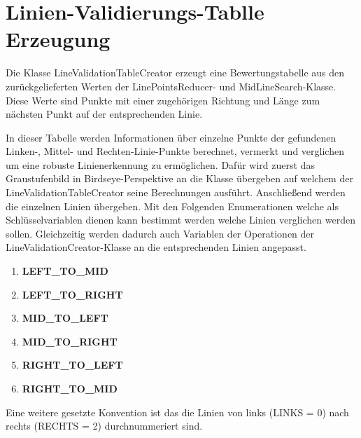 %

\chapter{Linien-Validierungs-Tablle Erzeugung}
\label{cha:Linien-Validierungs-Tablle Erzeugung} 
%
%
Die Klasse LineValidationTableCreator erzeugt eine Bewertungstabelle aus den zur{\"u}ckgelieferten Werten der LinePointsReducer- und MidLineSearch-Klasse. Diese Werte sind Punkte mit einer zugeh{\"o}rigen Richtung und L{\"a}nge zum n{\"a}chsten Punkt auf der entsprechenden Linie. 

In dieser Tabelle werden Informationen {\"u}ber einzelne Punkte der gefundenen Linken-, Mittel- und Rechten-Linie-Punkte berechnet, vermerkt und verglichen um eine robuste Linienerkennung zu erm{\"o}glichen. Daf{\"u}r wird zuerst das Graustufenbild in Birdseye-Perspektive an die Klasse {\"u}bergeben auf welchem der LineValidationTableCreator seine Berechnungen ausf{\"u}hrt. Anschlie{\ss}end werden die einzelnen Linien {\"u}bergeben. Mit den Folgenden Enumerationen welche als Schl{\"u}sselvariablen dienen kann bestimmt werden welche Linien verglichen werden sollen. Gleichzeitig werden dadurch auch Variablen der Operationen der LineValidationCreator-Klasse an die entsprechenden Linien angepasst.


\begin{enumerate}

\item[] \textbf{LEFT\_TO\_MID} \hfill \\
\item[] \textbf{LEFT\_TO\_RIGHT} \hfill \\

\item[] \textbf{MID\_TO\_LEFT} \hfill \\
\item[] \textbf{MID\_TO\_RIGHT} \hfill \\

\item[] \textbf{RIGHT\_TO\_LEFT} \hfill \\
\item[] \textbf{RIGHT\_TO\_MID} \hfill \\
\end{enumerate}


Eine weitere gesetzte Konvention ist das die Linien von links (LINKS = 0) nach rechts (RECHTS = 2) durchnummeriert sind.

